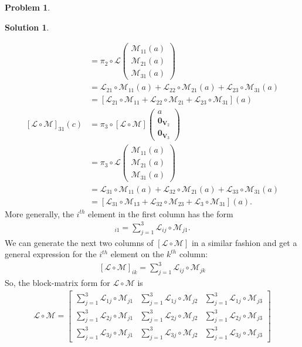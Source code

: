 \documentclass{article}
\theoremstyle{definition}
\newtheorem*{prob*}{Problem}
\newtheorem*{sln*}{Solution}
\newcommand{\V}{\mathbf{V}}
\newcommand{\lag}{\mathcal{L}}
\newcommand{\M}{\mathcal{M}}
\begin{document}
\begin{prob*}
\begin{sln*}
\begin{enumerate}
\begin{enumerate}
\begin{align*}
			&= \pi_2 \circ \lag \begin{pmatrix}
			\M_{11}(a)\\
			\M_{21}(a)\\
			\M_{31}(a)
			\end{pmatrix}\\
			&= \lag_{21}\circ\M_{11}(a) + \lag_{22}\circ\M_{21}(a) + \lag_{23}\circ\M_{31}(a)\\
			&= [\lag_{21}\circ \M_{11} + \lag_{22}\circ \M_{21} + \lag_{23}\circ \M_{31}](a)\\
			[\lag\circ\M]_{31}(c) &= \pi_3 \circ [\lag\circ \M]\begin{pmatrix}
			a\\ \mathbf{0}_{\V_2} \\ \mathbf{0}_{\V_3}
			\end{pmatrix}\\
			&= \pi_3 \circ \lag \begin{pmatrix}
			\M_{11}(a)\\
			\M_{21}(a)\\
			\M_{31}(a)
			\end{pmatrix}\\
			&= \lag_{31}\circ\M_{11}(a) + \lag_{32}\circ\M_{21}(a) + \lag_{33}\circ\M_{31}(a)\\
			&= [\lag_{31}\circ \M_{13} + \lag_{32}\circ \M_{23} + \lag_{3}\circ \M_{31}](a).
			\end{align*}
			More generally, the $i^{th}$ element in the first column has the form
			\begin{align*}
			[\lag\circ \M]_{i1} = \sum^3_{j=1}\lag_{ij}\circ \M_{j1}.
			\end{align*}
			We can generate the next two columns of $[\lag\circ \M]$ in a similar fashion and get a general expression for the $i^{th}$ element on the $k^{th}$ column:
			\begin{align*}
			\boxed{[\lag\circ \M]_{ik} = \sum^3_{j=1}\lag_{ij}\circ \M_{jk}}
			\end{align*}
			So, the block-matrix form for $\lag\circ\M$ is
			\begin{align*}
			\lag\circ \M = 
			\begin{bmatrix}
			\sum^3_{j=1}\lag_{1j}\circ \M_{j1} & \sum^3_{j=1}\lag_{1j}\circ \M_{j2} & \sum^3_{j=1}\lag_{1j}\circ \M_{j3}\\
			\sum^3_{j=1}\lag_{2j}\circ \M_{j1} & \sum^3_{j=1}\lag_{2j}\circ \M_{j2} & \sum^3_{j=1}\lag_{2j}\circ \M_{j3}\\
			\sum^3_{j=1}\lag_{3j}\circ \M_{j1} & \sum^3_{j=1}\lag_{3j}\circ \M_{j2} & \sum^3_{j=1}\lag_{3j}\circ \M_{j3}
			\end{bmatrix}
			\end{align*}
			\end{enumerate}

		\end{enumerate}
	\end{sln*}
	
	
\end{prob*}
\end{document}
